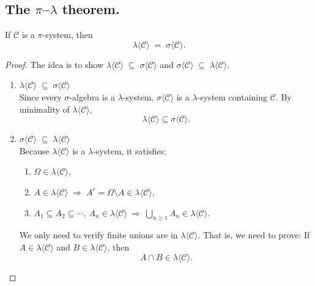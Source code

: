 \documentclass[11pt]{article}
\theoremstyle{definition}
\begin{document}
\subsection{The $\pi$--$\lambda$ theorem.}
\label{subsec:measures:pi-lambda-theorem} If $\mathcal{C}$ is a $\pi$-system, then
\[
\lambda\langle \mathcal{C}\rangle \;=\; \sigma\langle \mathcal{C}\rangle .
\]
\begin{proof}
    The idea is to show $\lambda\langle \mathcal{C}\rangle \;\subseteq\; \sigma\langle \mathcal{C}\rangle$ and $\sigma\langle \mathcal{C}\rangle \;\subseteq\; \lambda\langle \mathcal{C}\rangle.$\\
    \begin{enumerate}
        \item $\lambda\langle \mathcal{C}\rangle \;\subseteq\; \sigma\langle \mathcal{C}\rangle$ \\
        Since every $\sigma$-algebra is a $\lambda$-system, $\sigma\langle \mathcal{C}\rangle$ is a $\lambda$-system containing $\mathcal{C}$.
        By minimality of $\lambda\langle \mathcal{C}\rangle$,
        \[
        \lambda\langle \mathcal{C}\rangle \subseteq \sigma\langle \mathcal{C}\rangle .
        \]

        \item $\sigma\langle \mathcal{C}\rangle \;\subseteq\; \lambda\langle \mathcal{C}\rangle$ \\
        Because $\lambda\langle \mathcal{C}\rangle$ is a $\lambda$-system, it satisfies:
        \begin{enumerate}
        \item [(i)] $\Omega \in \lambda\langle \mathcal{C}\rangle$,\\
        \item [(ii)] $A\in \lambda\langle \mathcal{C}\rangle \;\Rightarrow\; A^c=\Omega\setminus A \in \lambda\langle \mathcal{C}\rangle$,\\
        \item [(iii)] $A_1\subseteq A_2\subseteq \cdots,\ A_n\in \lambda\langle \mathcal{C}\rangle
        \ \Rightarrow\ \bigcup_{n\ge 1} A_n \in \lambda\langle \mathcal{C}\rangle$.
        \end{enumerate}

        We only need to verify finite unions are in $\lambda\langle \mathcal{C}\rangle$. That is, we need to prove: If $A \in \lambda\langle \mathcal{C}\rangle$ and $B \in \lambda\langle \mathcal{C}\rangle$, then
        \[
        A \cap B \in \lambda\langle \mathcal{C}\rangle.
        \]
        

\end{enumerate}
\end{proof}
\end{document}
